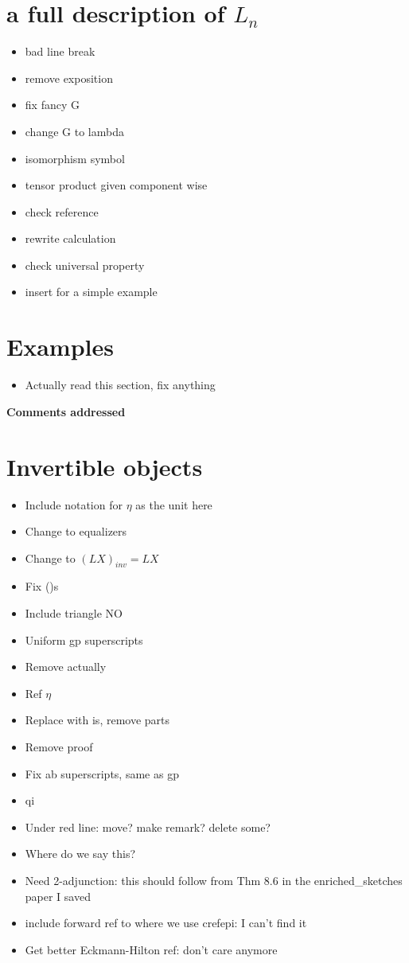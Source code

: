\documentclass{amsart}
\begin{document}
\section{a full description of $L_n $}
\begin{itemize}
\item bad line break
\item remove exposition
\item fix fancy G
\item change G to lambda
\item isomorphism symbol
\item tensor product given component wise
\item check reference
\item rewrite calculation
\item check universal property
\item insert for a simple example
\end{itemize}
\section{ Examples}
\begin{itemize}
\item Actually read this section, fix anything
\end{itemize}
\newpage

\begin{center}
\begin{Large}
\textbf{Comments addressed}
\end{Large}
\end{center}
\vskip1cm


\section{ Invertible objects}
\begin{itemize}
\item Include notation for $\eta$ as the unit here
\item Change to equalizers
\item Change to $(LX)_{inv} = LX$
\item Fix ()s
\item Include triangle NO
\item Uniform gp superscripts
\item Remove actually
\item Ref $\eta$
\item Replace with is, remove parts
\item Remove proof
\item Fix ab superscripts, same as gp
\item qi
\item Under red line: move? make remark? delete some?
\item Where do we say this?
\item Need 2-adjunction: this should follow from Thm 8.6 in the enriched\_sketches paper I saved
\item include forward ref to where we use cref{epi}: I can't find it
\item Get better Eckmann-Hilton ref: don't care anymore
\end{itemize}
\end{document}
